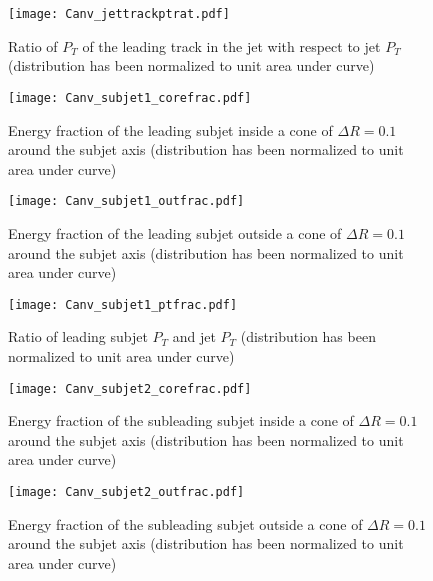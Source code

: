 \begin{figure}[H]
    \begin{center}
        \texttt{[image: Canv\_jettrackptrat.pdf]}
        \caption{Ratio of $P_{T}$ of the leading track in the jet with respect to jet $P_{T}$ (distribution has been normalized to unit area under curve)}
    \end{center}
\end{figure}
\begin{figure}[H]
    \begin{center}
        \texttt{[image: Canv\_subjet1\_corefrac.pdf]}
        \caption{Energy fraction of the leading subjet inside a cone of $\Delta R=0.1$ around the subjet axis (distribution has been normalized to unit area under curve)}
    \end{center}
\end{figure}
\begin{figure}[H]
    \begin{center}
        \texttt{[image: Canv\_subjet1\_outfrac.pdf]}
        \caption{Energy fraction of the leading subjet outside a cone of $\Delta R=0.1$ around the subjet axis (distribution has been normalized to unit area under curve)}
    \end{center}
\end{figure}
\begin{figure}[H]
    \begin{center}
        \texttt{[image: Canv\_subjet1\_ptfrac.pdf]}
        \caption{Ratio of leading subjet $P_{T}$ and jet $P_{T}$ (distribution has been normalized to unit area under curve)}
    \end{center}
\end{figure}
\begin{figure}[H]
    \begin{center}
        \texttt{[image: Canv\_subjet2\_corefrac.pdf]}
        \caption{Energy fraction of the subleading subjet inside a cone of $\Delta R=0.1$ around the subjet axis (distribution has been normalized to unit area under curve)}
    \end{center}
\end{figure}
\begin{figure}[H]
    \begin{center}
        \texttt{[image: Canv\_subjet2\_outfrac.pdf]}
        \caption{Energy fraction of the subleading subjet outside a cone of $\Delta R=0.1$ around the subjet axis (distribution has been normalized to unit area under curve)}
    \end{center}
\end{figure}
